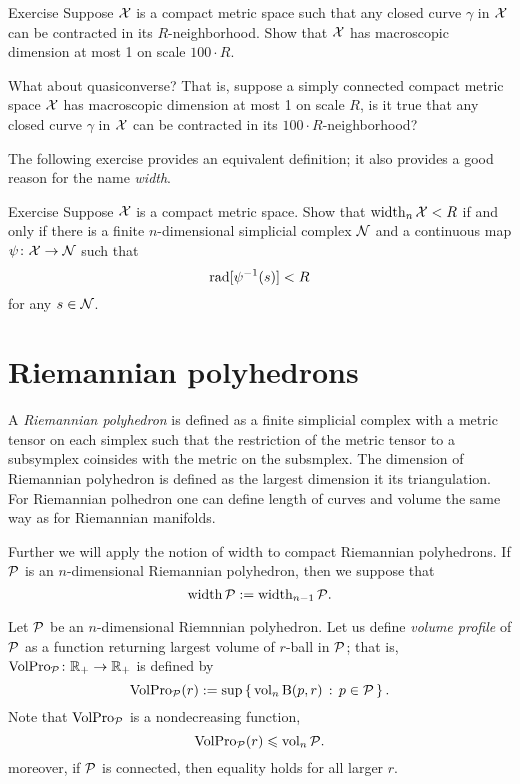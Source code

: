 \begin{thm}{Exercise}\label{ex:macrodimension}
Suppose $\mathcal{X}$ is a compact metric space such that any closed curve $\gamma$ in $\mathcal{X}$ can be contracted in its $R$-neighborhood.
Show that $\mathcal{X}$ has macroscopic dimension at most 1 on scale $100\cdot R$.

What about quasiconverse? That is, suppose a simply connected compact metric space $\mathcal{X}$ has macroscopic dimension at most 1 on scale $R$, is it true that any closed curve $\gamma$ in $\mathcal{X}$ can be contracted in its $100\cdot R$-neighborhood?
\end{thm}


The following exercise provides an equivalent definition;
it also provides a good reason for the name \emph{width}.

\begin{thm}{Exercise}\label{ex:width=suprad(inv)}
Suppose $\mathcal{X}$ is a compact metric space.
Show that $\operatorname{\rm width}\nolimits_n\mathcal{X}<R$ if and only if there is a finite $n$-dimensional simplicial complex $\mathcal{N}$ and a continuous map $\psi\colon\mathcal{X}\to \mathcal{N}$
such that 
\[\mathop{\rm rad}\nolimits[\psi^{-1}(s)]<R\]
for any $s\in \mathcal{N}$.
\end{thm}

\section{Riemannian polyhedrons}

A \emph{Riemannian polyhedron} is defined as a finite simplicial complex with a metric tensor on each simplex such that the restriction of the metric tensor to a subsymplex coinsides with the metric on the subsmplex.
The dimension of Riemannian polyhedron is defined as the largest dimension it its triangulation.
For Riemannian polhedron one can define length of curves and volume the same way as for Riemannian manifolds.


Further we will apply the notion of width to compact Riemannian polyhedrons.
If $\mathcal{P}$ is an $n$-dimensional Riemannian polyhedron, then 
we suppose that
\[\operatorname{\rm width}\nolimits\mathcal{P}\mathrel{:=}\operatorname{\rm width}\nolimits_{n-1}\mathcal{P}.\]

Let $\mathcal{P}$ be an $n$-dimensional Riemnnian polyhedron.
Let us define \emph{volume profile} of $\mathcal{P}$ as a function 
returning largest volume of $r$-ball in $\mathcal{P}$;
that is, $\operatorname{\rm VolPro}\nolimits_{\mathcal{P}}\colon\mathbb{R}_+\to\mathbb{R}_+$ is defined by 
\[\operatorname{\rm VolPro}\nolimits_{\mathcal{P}}(r)\mathrel{:=} \sup\left\{\,{\operatorname{\rm vol}\nolimits_n \mathrm{B}{}(p,r)}\,:\,{p\in\mathcal{P}}\,\right\}.\]
Note that 
$\operatorname{\rm VolPro}\nolimits_{\mathcal{P}}$ is a nondecreasing function,
\[\operatorname{\rm VolPro}\nolimits_{\mathcal{P}}(r)\leqslant\operatorname{\rm vol}\nolimits_n\mathcal{P}.\]
moreover, if $\mathcal{P}$ is connected, then equality holds
for all larger $r$.


